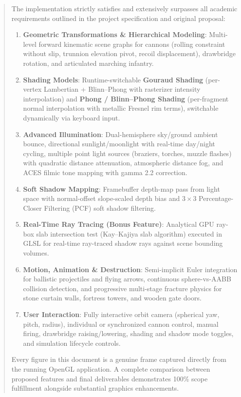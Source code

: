 \documentclass[11pt,a4paper]{article}
\begin{document}
\begin{abstract}
The implementation strictly satisfies and extensively surpasses all academic requirements outlined in the project specification and original proposal:
\begin{enumerate}[itemsep=1pt,topsep=2pt]
  \item \textbf{Geometric Transformations \& Hierarchical Modeling}: Multi-level forward kinematic scene graphs for cannons (rolling constraint without slip, trunnion elevation pivot, recoil displacement), drawbridge rotation, and articulated marching infantry.
  \item \textbf{Shading Models}: Runtime-switchable \textbf{Gouraud Shading} (per-vertex Lambertian + Blinn--Phong with rasterizer intensity interpolation) and \textbf{Phong / Blinn--Phong Shading} (per-fragment normal interpolation with metallic Fresnel rim terms), switchable dynamically via keyboard input.
  \item \textbf{Advanced Illumination}: Dual-hemisphere sky/ground ambient bounce, directional sunlight/moonlight with real-time day/night cycling, multiple point light sources (braziers, torches, muzzle flashes) with quadratic distance attenuation, atmospheric distance fog, and ACES filmic tone mapping with gamma 2.2 correction.
  \item \textbf{Soft Shadow Mapping}: Framebuffer depth-map pass from light space with normal-offset slope-scaled depth bias and $3 \times 3$ Percentage-Closer Filtering (PCF) soft shadow filtering.
  \item \textbf{Real-Time Ray Tracing (Bonus Feature)}: Analytical GPU ray-box slab intersection test (Kay--Kajiya slab algorithm) executed in GLSL for real-time ray-traced shadow rays against scene bounding volumes.
  \item \textbf{Motion, Animation \& Destruction}: Semi-implicit Euler integration for ballistic projectiles and flying arrows, continuous sphere-vs-AABB collision detection, and progressive multi-stage fracture physics for stone curtain walls, fortress towers, and wooden gate doors.
  \item \textbf{User Interaction}: Fully interactive orbit camera (spherical yaw, pitch, radius), individual or synchronized cannon control, manual firing, drawbridge raising/lowering, shading and shadow mode toggles, and simulation lifecycle controls.
\end{enumerate}
Every figure in this document is a genuine frame captured directly from the running OpenGL application. A complete comparison between proposed features and final deliverables demonstrates 100\% scope fulfillment alongside substantial graphics enhancements.
\end{abstract}
\end{document}
